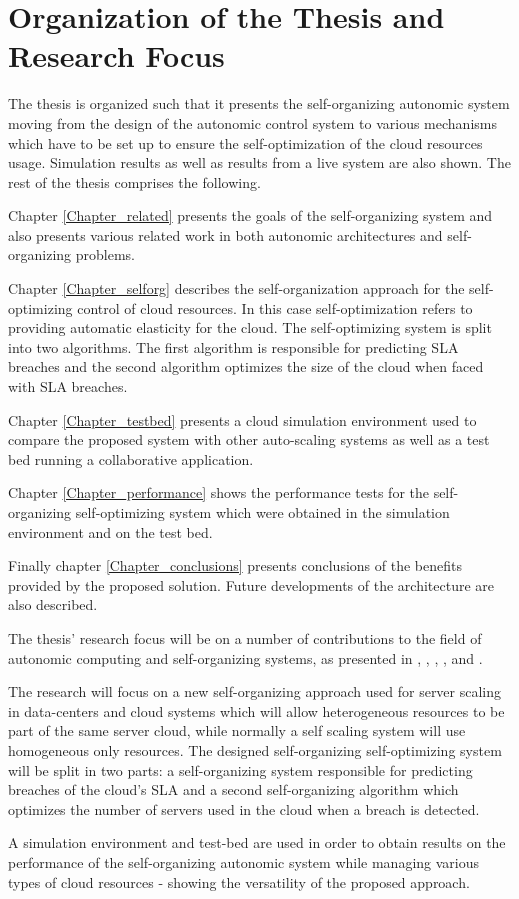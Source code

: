 \section{Organization of the Thesis and Research Focus}

The thesis is organized such that it presents the self-organizing autonomic system moving from the design of the autonomic control system to various mechanisms which have to be set up to ensure the self-optimization of the cloud resources usage. Simulation results as well as results from a live system are also shown. The rest of the thesis comprises the following.

Chapter \ref{Chapter_related} presents the goals of the self-organizing system and also presents various related work in both autonomic architectures and self-organizing problems.

Chapter \ref{Chapter_selforg} describes the self-organization approach for the self-optimizing control of cloud resources. In this case self-optimization refers to providing automatic elasticity for the cloud. The self-optimizing system is split into two algorithms. The first algorithm is responsible for predicting SLA breaches and the second algorithm optimizes the size of the cloud when faced with SLA breaches.

Chapter \ref{Chapter_testbed} presents a cloud simulation environment used to compare the proposed system with other auto-scaling systems as well as a test bed running a collaborative application.

Chapter \ref{Chapter_performance} shows the performance tests for the self-organizing self-optimizing system which were obtained in the simulation environment and on the test bed.

Finally chapter \ref{Chapter_conclusions} presents conclusions of the benefits provided by the proposed solution. Future developments of the architecture are also described.

The thesis' research focus will be on a number of contributions to the field of autonomic computing and self-organizing systems, as presented in \cite{bogdan:lindi}, \cite{bogdan:amgcc2013}, \cite{bogdan:cts2012}, \cite{bogdan:conti2010}, \cite{bogdan:saci2013} and \cite{bogdan:miles2012chapter}. 

The research will focus on a new self-organizing approach used for server scaling in data-centers and cloud systems which will allow heterogeneous resources to be part of the same server cloud, while normally a self scaling system will use homogeneous only resources. The designed self-organizing self-optimizing system will be split in two parts: a self-organizing system responsible for predicting breaches of the cloud's SLA and a second self-organizing algorithm which optimizes the number of servers used in the cloud when a breach is detected.

A simulation environment and test-bed are used in order to obtain results on the performance of the self-organizing autonomic system while managing various types of cloud resources - showing the versatility of the proposed approach.